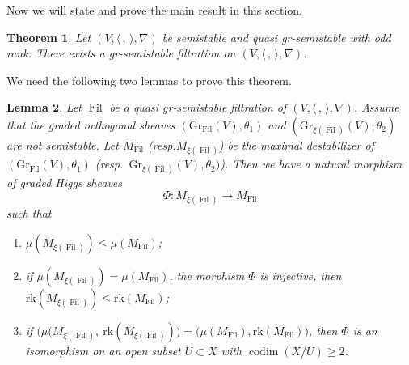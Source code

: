 \documentclass[11pt]{article}
\newcommand{\resp}{resp.\xspace}
\numberwithin{equation}{section}
\newcommand{\grsemistable}{gr\nobreakdash-semi\-stable\xspace}
\DeclareMathOperator{\codim}{codim}
\DeclareMathOperator{\Filt}{Fil}
\newcommand{\rk}{\mathrm{rk}}
\newcommand{\Gr}{\mathrm{Gr}}
\theoremstyle{plain}
\newtheorem{thm}{Theorem}[section]
\newtheorem{lem}[thm]{Lemma}
\theoremstyle{definition}
\begin{document}
Now we will state and prove the main result in this section.
\begin{thm}\label{main thm}
Let $(V,\langle \,, \, \rangle,\nabla)$ be semistable and quasi \grsemistable with odd rank. There exists a \grsemistable filtration on $(V,\langle \,, \, \rangle,\nabla)$.
\end{thm}

We need the following two lemmas to prove this theorem.
\begin{lem}\label{decrease}
Let $\Filt$ be a quasi \grsemistable filtration of $(V, \langle \,, \, \rangle, \nabla)$. Assume that the graded orthogonal sheaves $(\Gr_{\Filt}(V),\theta_1)$ and $(\Gr_{\xi(\Filt)}(V),\theta_2)$ are not semistable. Let $M_{\Filt}$ (\resp $M_{\xi(\Filt)}$) be the maximal destabilizer of $(\Gr_{\Filt}(V),\theta_1)$ (resp.\ $\Gr_{\xi(\Filt)}(V),\theta_2)$). Then we have a natural morphism of graded Higgs sheaves
\[
\Phi: M_{\xi(\Filt)}\to M_{\Filt}
\]
such that
\begin{enumerate}
\item $\mu(M_{\xi(\Filt)})\leq \mu(M_{\Filt})$;
\item if $\mu(M_{\xi(\Filt)})= \mu(M_{\Filt})$, the morphism $\Phi$ is injective, then $\rk(M_{\xi(\Filt)})\leq\rk(M_{\Filt})$;
\item if $\big(\mu(M_{\xi(\Filt)},\ \rk(M_{\xi(\Filt)})\big)= \big(\mu(M_{\Filt}),\rk(M_{\Filt})\big)$, then $\Phi$ is an isomorphism on an open subset $U \subset X$ with $\codim(X/U) \geq 2$.
\end{enumerate}
\end{lem}
\end{document}
